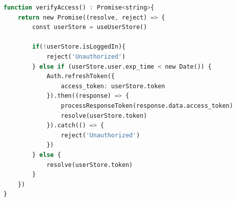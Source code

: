 \begin{lstlisting}[language=Octave, caption=Access verification for making requests]
function verifyAccess() : Promise<string>{
    return new Promise((resolve, reject) => {
        const userStore = useUserStore()
        
        if(!userStore.isLoggedIn){
            reject('Unauthorized')
        } else if (userStore.user.exp_time < new Date()) {
            Auth.refreshToken({
                access_token: userStore.token
            }).then((response) => {
                processResponseToken(response.data.access_token)
                resolve(userStore.token)
            }).catch(() => {
                reject('Unauthorized')
            })
        } else {
            resolve(userStore.token)
        }
    })
}
\end{lstlisting}
